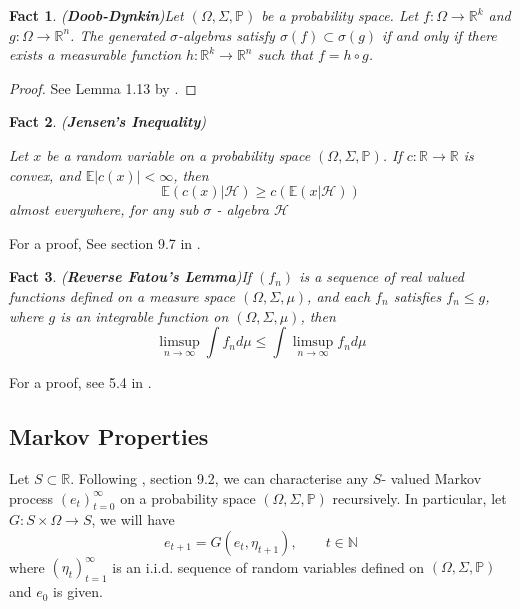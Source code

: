 \documentclass[12pt]{ectaart}
\newcommand{\1}{\mathbbm 1}
\theoremstyle{plain}
\newtheorem{fact}{Fact}[section]
\theoremstyle{definition}
\begin{document}
\begin{fact}(\textbf{Doob-Dynkin})\label{fact: dd}
	Let $(\Omega, \Sigma, \mathbb{P})$ be a probability space. Let $f\colon \Omega\rightarrow \mathbb{R}^{k}$ and $g\colon \Omega \rightarrow \mathbb{R}^{n}$. The generated $\sigma$-algebras satisfy $\sigma(f)\subset \sigma(g)$ if and only if there exists a measurable function $h\colon \mathbb{R}^{k}\rightarrow \mathbb{R}^{n}$ such that $f = h\circ g$.
\end{fact}
\begin{proof}
	See Lemma 1.13 by \cite{Kallenberg1997}.
\end{proof}

\begin{fact}(\textbf{Jensen's Inequality})\label{fact: jensen}
	
	Let $x$ be a random variable on a probability space $(\Omega, \Sigma, \mathbb{P})$. If  $c \colon \mathbb{R} \rightarrow \mathbb{R}$ is convex, and $\mathbb{E}\vert c(x)\vert <\infty$, then 
	\begin{equation*}
	\mathbb{E}(c(x)\vert \mathcal{H}) \geq c(\mathbb{E}(x\vert \mathcal{H})) 
	\end{equation*}
	almost everywhere, for any sub $\sigma$ - algebra $\mathcal{H}$
\end{fact}

For a proof, See section 9.7 in \cite{Williams1991}.


\begin{fact}(\textbf{Reverse Fatou's Lemma})\label{fact: fatou}
		 If $(f_{n})$  is a sequence of real valued functions defined on a measure space $(\Omega, \Sigma, \mu)$, and each $f_{n}$ satisfies $f_{n}\leq g$, where $g$ is an integrable function on $(\Omega, \Sigma, \mu)$, then $$\limsup_{n\rightarrow \infty}\int f_{n}d\mu \leq \int \limsup_{n\rightarrow\infty}f_{n}d\mu$$
\end{fact}

For a proof, see 5.4 in \cite{Williams1991}.

	\subsection*{Markov Properties}\label{sec: markov}
	
	Let $S\subset \mathbb{R}$. Following \cite{Stachurski2009}, section 9.2, we can characterise any $S$- valued Markov process $(e_{t})_{t=0}^{\infty}$ on a probability space $(\Omega,\Sigma , \mathbb{P})$ recursively. In particular, let $G\colon S\times \Omega  \rightarrow S$, we will have
	\begin{equation}\label{eq: SRS}
	e_{t+1} = G(e_{t},\eta_{t+1}), \qquad t\in \mathbb{N}
	\end{equation}
	where $(\eta_{t})_{t=1}^{\infty}$ is an {\sc i.i.d}. sequence of random variables defined on $(\Omega,\Sigma , \mathbb{P})$ and $e_{0}$ is given. 
	
\end{document}
